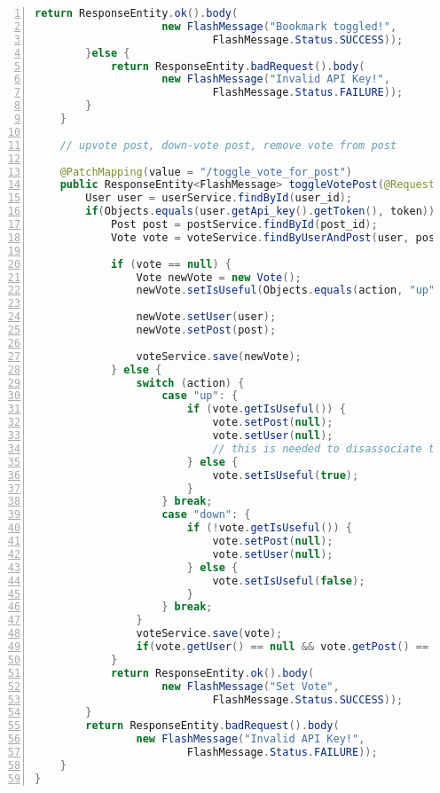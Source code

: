 \documentclass[paper=a4,12pt]{scrreprt}
\begin{document}
\begin{lstlisting}[caption={Blog - REST API}, captionpos=b, label={listing:restcontroller_blog}, language=java, numbers=left,
  stepnumber=1]
            return ResponseEntity.ok().body(
                    new FlashMessage("Bookmark toggled!",
                            FlashMessage.Status.SUCCESS));
        }else {
            return ResponseEntity.badRequest().body(
                    new FlashMessage("Invalid API Key!",
                            FlashMessage.Status.FAILURE));
        }
    }

    // upvote post, down-vote post, remove vote from post

    @PatchMapping(value = "/toggle_vote_for_post")
    public ResponseEntity<FlashMessage> toggleVotePost(@RequestParam("post_id") Long post_id, @RequestParam("user_id") Long user_id, @RequestParam("action") String action, @RequestParam("api_key") String token) {
        User user = userService.findById(user_id);
        if(Objects.equals(user.getApi_key().getToken(), token)) {
            Post post = postService.findById(post_id);
            Vote vote = voteService.findByUserAndPost(user, post);

            if (vote == null) {
                Vote newVote = new Vote();
                newVote.setIsUseful(Objects.equals(action, "up"));

                newVote.setUser(user);
                newVote.setPost(post);

                voteService.save(newVote);
            } else {
                switch (action) {
                    case "up": {
                        if (vote.getIsUseful()) {
                            vote.setPost(null);
                            vote.setUser(null);
                            // this is needed to disassociate the vote from the user and post
                        } else {
                            vote.setIsUseful(true);
                        }
                    } break;
                    case "down": {
                        if (!vote.getIsUseful()) {
                            vote.setPost(null);
                            vote.setUser(null);
                        } else {
                            vote.setIsUseful(false);
                        }
                    } break;
                }
                voteService.save(vote);
                if(vote.getUser() == null && vote.getPost() == null) voteService.delete(vote);
            }
            return ResponseEntity.ok().body(
                    new FlashMessage("Set Vote",
                            FlashMessage.Status.SUCCESS));
        }
        return ResponseEntity.badRequest().body(
                new FlashMessage("Invalid API Key!",
                        FlashMessage.Status.FAILURE));
    }
}
\end{lstlisting}
\end{document}
